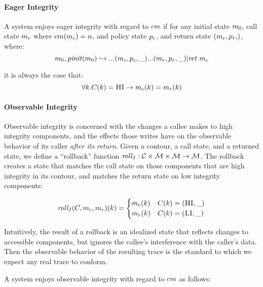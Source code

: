\documentclass[conference]{IEEEtran}
\begin{document}
    \paragraph{Eager Integrity}

      A system enjoys eager integrity with regard to \(cm\) if for any initial state \(m_0\),
      call state \(m_c\) where \(cm(m_c) = n\), and policy state \(p_c\), and
      return state \(\mpstate{\mach_r,\pol_r}\), where:
      \[m_0,\mathit{pinit}(m_0) \hookrightarrow ... (m_c,p_c,\_) ...
        (m_r,p_r,\_) | \mathit{ret}\ m_c\]

      it is always the case that:
      \[\forall k . C(k) = \textsc{HI} \rightarrow m_c(k) = m_r(k)\]

    \paragraph{Observable Integrity}

      Observable integrity is concerned with the changes a callee makes to high integrity components,
      and the effects those writes have on the observable behavior of its caller
      {\it after its return}. Given a contour, a call state, and a returned state, we define
      a ``rollback'' function \(\mathit{roll}_I : {\mathcal C} \times {\mathcal M} \times {\mathcal M}
      \rightarrow {\mathcal M}\). The rollback creates a state that matches the call
      state on those components that are high integrity in its contour, and matches the return state
      on low integrity components:

      \[\mathit{roll}_I(C,m_c,m_r)(k) =
      \begin{cases}
        m_c(k) & C(k) = (\textsc{HI},\_) \\
        m_r(k) & C(k) = (\textsc{LI},\_) \\
      \end{cases}\]

      Intuitively, the result of a rollback is an idealized state that reflects changes to accessible
      components, but ignores the callee's interference with the caller's data. Then the observable
      behavior of the resulting trace is the standard to which we expect any real trace to conform.

      A system enjoys observable integrity with regard to \(cm\) as follows:
\end{document}

